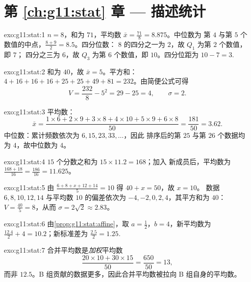 \section*{第 \ref{ch:g11:stat} 章 --- 描述统计}

\begin{solution}{exo:g11:stat:1}
$n = 8$，和为 $71$，平均数 $\bar x = \frac{71}{8} = 8.875$。中位数为
第 $4$ 与第 $5$ 个数值的中点，$\frac{8 + 9}{2} = 8.5$。四分位数：
$8$ 的四分之一为 $2$，故 $Q_1$ 为第 $2$ 个数值，即 $7$；
四分之三为 $6$，故 $Q_3$ 为第 $6$ 个数值，即 $10$。四分位距为
$10 - 7 = 3$.
\end{solution}

\begin{solution}{exo:g11:stat:2}
和为 $40$，故 $\bar x = 5$。平方和：
$4 + 16 + 16 + 16 + 25 + 25 + 49 + 81 = 232$。由简便公式可得
\[
V = \frac{232}{8} - 5^2 = 29 - 25 = 4,
\qquad
\sigma = 2 .
\]
\end{solution}

\begin{solution}{exo:g11:stat:3}
平均数：
\[
\bar x = \frac{1 \times 6 + 2 \times 9 + 3 \times 8 + 4 \times 10
+ 5 \times 9 + 6 \times 8}{50}
= \frac{181}{50} = 3.62 .
\]
中位数：累计频数依次为 $6, 15, 23, 33, \dots$，因此
排序后的第 $25$ 与第 $26$ 个数据均为 $4$，故中位数为 $4$。
\end{solution}

\begin{solution}{exo:g11:stat:4}
$15$ 个分数之和为 $15 \times 11.2 = 168$；加入
新成员后，平均数为 $\frac{168 + 18}{16} = \frac{186}{16} = 11.625$。
\end{solution}

\begin{solution}{exo:g11:stat:5}
由 $\frac{6 + 8 + x + 12 + 14}{5} = 10$ 得 $40 + x = 50$，故 $x = 10$。
数据 $6, 8, 10, 12, 14$ 与平均数 $10$ 的偏差依次为
$-4, -2, 0, 2, 4$，其平方和为 $40$：
$V = \frac{40}{5} = 8$，从而 $\sigma = 2\sqrt2 \approx 2.83$。
\end{solution}

\begin{solution}{exo:g11:stat:6}
由\cref{prop:g11:stat:affine}，取 $a = \frac12$，$b = 4$，新平均数为
$\frac{12.4}{2} + 4 = 10.2$；新标准差为
$\frac{2.5}{2} = 1.25$.
\end{solution}

\begin{solution}{exo:g11:stat:7}
合并平均数是\emph{加权}平均数
\[
\frac{20 \times 10 + 30 \times 15}{50} = \frac{650}{50} = 13,
\]
而非 $12.5$。B 组贡献的数据更多，因此合并平均数被拉向
B 组自身的平均数。
\end{solution}

